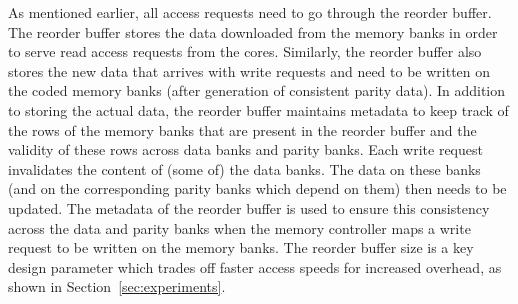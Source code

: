 As mentioned earlier, all access requests need to go through the reorder buffer. The reorder buffer stores the data downloaded from the memory banks in order to serve read access requests from the cores. Similarly, the reorder buffer also stores the new data that arrives with write requests and need to be written on the coded memory banks (after generation of consistent parity data). In addition to storing the actual data, the reorder buffer maintains metadata to keep track of the rows of the memory banks that are present in the reorder buffer and the validity of these rows across data banks and parity banks. Each write request invalidates the content of (some of) the data banks. The data on these banks (and on the corresponding parity banks which depend on them) then needs to be updated. The metadata of the reorder buffer is used to ensure this consistency across the data and parity banks when the memory controller maps a write request to be written on the memory banks. The reorder buffer size is a key design parameter which trades off faster access speeds for increased overhead, as shown in Section~\ref{sec:experiments}.


